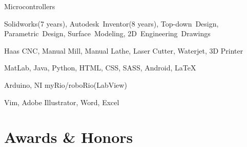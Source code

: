 \documentclass{resume}
\begin{document}
\begin{skills}{Microcontrollers}

    \item [CAD] Solidworks(7 years), Autodesk~Inventor(8 years), Top-down~Design, Parametric~Design, Surface~Modeling, 2D~Engineering~Drawings
    \item [Manufacturing] Haas CNC, Manual Mill, Manual Lathe, Laser Cutter, Waterjet, 3D Printer
    \item [Programming] MatLab, Java, Python, HTML, CSS, SASS, Android, \LaTeX
    \item [Microcontrollers] Arduino, NI myRio/roboRio(LabView)
    \item [Software] Vim, Adobe Illustrator, Word, Excel
\end{skills}
  \section{Awards \& Honors}
\end{document}
